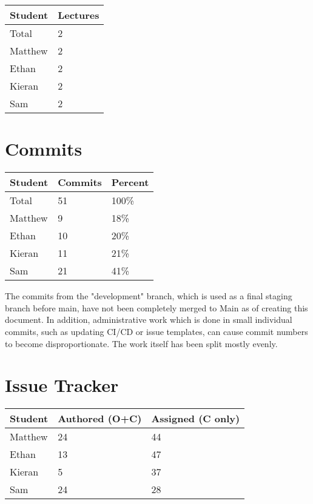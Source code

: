 \documentclass{article}
\begin{document}
\begin{table}[H]
\centering
\begin{tabular}{ll}
\toprule
\textbf{Student} & \textbf{Lectures}\\
\midrule
Total & 2\\
Matthew & 2\\
Ethan & 2\\
Kieran & 2\\
Sam & 2\\
\bottomrule
\end{tabular}
\end{table}

\section{Commits}

\begin{table}[H]
\centering
\begin{tabular}{lll}
\toprule
\textbf{Student} & \textbf{Commits} & \textbf{Percent}\\
\midrule
Total & 51 & 100\% \\
Matthew & 9 & 18\% \\
Ethan & 10 & 20\% \\
Kieran & 11 & 21\% \\
Sam & 21 & 41\% \\
\bottomrule
\end{tabular}
\end{table}

The commits from the "development" branch, which is used as a final staging branch before main, have not been completely merged to Main as of creating this document. In addition, administrative work which is done in small individual commits, such as updating CI/CD or issue templates, can cause commit numbers to become disproportionate. The work itself has been split mostly evenly.

\section{Issue Tracker}

\begin{table}[H]
\centering
\begin{tabular}{lll}
\toprule
\textbf{Student} & \textbf{Authored (O+C)} & \textbf{Assigned (C only)}\\
\midrule
Matthew & 24 & 44 \\
Ethan & 13 & 47 \\
Kieran & 5 & 37\\
Sam & 24 & 28 \\
\bottomrule
\end{tabular}
\end{table}
\end{document}
